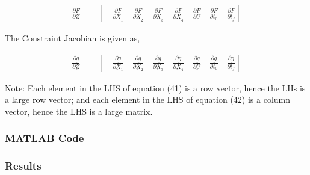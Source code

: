 \documentclass[11pt,usenames]{article}
\begin{document}
	\begin{align}
	\frac{\partial F}{\partial \underbar Z} &= \left[ \quad \frac{\partial F}{\partial \underbar X_{1}} \quad \frac{\partial F}{\partial \underbar X_{2}} \quad \frac{\partial F}{\partial \underbar X_{3}} \quad \frac{\partial F}{\partial \underbar X_{4}} \quad \frac{\partial F}{\partial \underbar U} \quad \frac{\partial F}{\partial t_{0}} \quad \frac{\partial F}{\partial t_{f}} \right]
	\end{align}
	
	The Constraint Jacobian is given as,
	
	\begin{align}
	\frac{\partial \underbar g}{\partial \underbar Z}  &= \left[ \quad \frac{\partial \underbar g}{\partial \underbar X_{1}} \quad \frac{\partial \underbar g}{\partial \underbar X_{2}} \quad \frac{\partial \underbar g}{\partial \underbar X_{3}} \quad \frac{\partial \underbar g}{\partial \underbar X_{4}} \quad \frac{\partial \underbar g}{\partial \underbar U} \quad \frac{\partial \underbar g}{\partial t_{0}} \quad \frac{\partial \underbar g}{\partial t_{f}} \right]
	\end{align}
	
	Note: Each element in the LHS of equation (41) is a row vector, hence the LHs is a large row vector; and each element in the LHS of equation (42) is a column vector, hence the LHS is a large matrix.
	
	
	\newpage
	
	
	\subsubsection{MATLAB Code}
	
	
	
	\newpage
	
	
	
	\newpage
	
	
	
	\newpage
	
	
	
	
	
	
	
	
	
	\newpage
	
	
	\subsubsection{Results}
	
\end{document}
